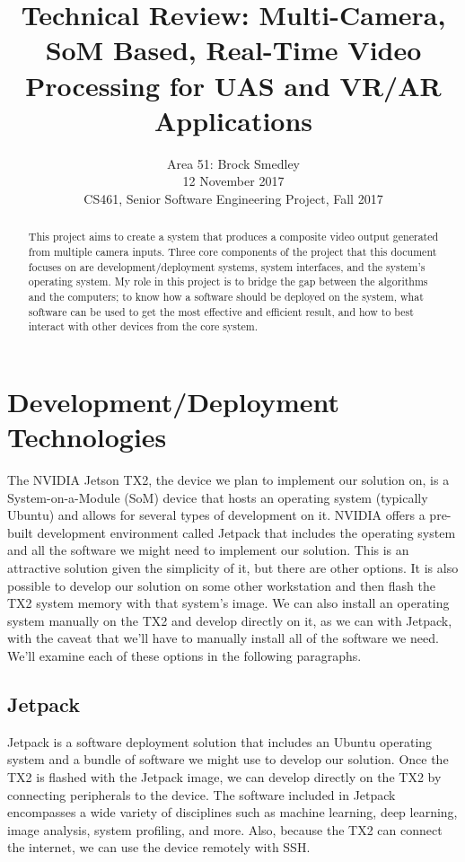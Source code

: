 \documentclass[letterpaper,10pt,serif,draftclsnofoot,onecolumn,compsoc,titlepage]{IEEEtran}
\title{Technical Review: Multi-Camera, SoM Based, Real-Time Video Processing for UAS and VR/AR Applications}
\author{Area 51: Brock Smedley \\ 12 November 2017 \\ CS461, Senior Software Engineering Project, Fall 2017}
\begin{document}
\begin{titlepage}
\maketitle

\begin{abstract}
This project aims to create a system that produces a composite video output generated from multiple camera inputs. Three core components of the project that this document focuses on are development/deployment systems, system interfaces, and the system's operating system. My role in this project is to bridge the gap between the algorithms and the computers; to know how a software should be deployed on the system, what software can be used to get the most effective and efficient result, and how to best interact with other devices from the core system.

\thispagestyle{empty}
\end{abstract}
\end{titlepage}
\newpage


\section{Development/Deployment Technologies}
The NVIDIA Jetson TX2, the device we plan to implement our solution on, is a System-on-a-Module (SoM) device that hosts an operating system (typically Ubuntu) and allows for several types of development on it. NVIDIA offers a pre-built development environment called Jetpack that includes the operating system and all the software we might need to implement our solution. This is an attractive solution given the simplicity of it, but there are other options. It is also possible to develop our solution on some other workstation and then flash the TX2 system memory with that system’s image. We can also install an operating system manually on the TX2 and develop directly on it, as we can with Jetpack, with the caveat that we’ll have to manually install all of the software we need. We’ll examine each of these options in the following paragraphs.

\subsection{Jetpack}
Jetpack is a software deployment solution that includes an Ubuntu operating system and a bundle of software we might use to develop our solution. Once the TX2 is flashed with the Jetpack image, we can develop directly on the TX2 by connecting peripherals to the device. The software included in Jetpack encompasses a wide variety of disciplines such as machine learning, deep learning, image analysis, system profiling, and more. Also, because the TX2 can connect the internet, we can use the device remotely with SSH.
\end{document}
